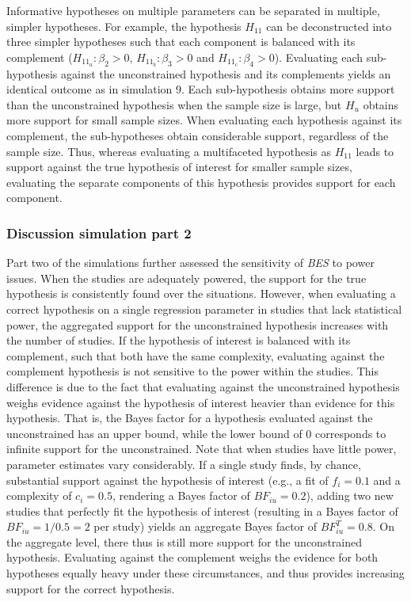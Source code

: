 \documentclass[
]{article}
\begin{document}
Informative hypotheses on multiple parameters can be separated in
multiple, simpler hypotheses. For example, the hypothesis \(H_{11}\) can
be deconstructed into three simpler hypotheses such that each component
is balanced with its complement (\(H_{11_a}: \beta_2 > 0\),
\(H_{11_b}: \beta_3 > 0\) and \(H_{11_c}: \beta_4 > 0\)). Evaluating
each sub-hypothesis against the unconstrained hypothesis and its
complements yields an identical outcome as in simulation 9. Each
sub-hypothesis obtains more support than the unconstrained hypothesis
when the sample size is large, but \(H_u\) obtains more support for
small sample sizes. When evaluating each hypothesis against its
complement, the sub-hypotheses obtain considerable support, regardless
of the sample size. Thus, whereas evaluating a multifaceted hypothesis
as \(H_{11}\) leads to support against the true hypothesis of interest
for smaller sample sizes, evaluating the separate components of this
hypothesis provides support for each component.

\hypertarget{discussion-simulation-part-2}{%
\subsubsection{Discussion simulation part
2}\label{discussion-simulation-part-2}}

Part two of the simulations further assessed the sensitivity of
\emph{BES} to power issues. When the studies are adequately powered, the
support for the true hypothesis is consistently found over the
situations. However, when evaluating a correct hypothesis on a single
regression parameter in studies that lack statistical power, the
aggregated support for the unconstrained hypothesis increases with the
number of studies. If the hypothesis of interest is balanced with its
complement, such that both have the same complexity, evaluating against
the complement hypothesis is not sensitive to the power within the
studies. This difference is due to the fact that evaluating against the
unconstrained hypothesis weighs evidence against the hypothesis of
interest heavier than evidence for this hypothesis. That is, the Bayes
factor for a hypothesis evaluated against the unconstrained has an upper
bound, while the lower bound of \(0\) corresponds to infinite support
for the unconstrained. Note that when studies have little power,
parameter estimates vary considerably. If a single study finds, by
chance, substantial support against the hypothesis of interest (e.g., a
fit of \(f_i=0.1\) and a complexity of \(c_i=0.5\), rendering a Bayes
factor of \(BF_{iu}=0.2\)), adding two new studies that perfectly fit
the hypothesis of interest (resulting in a Bayes factor of
\(BF_{iu}=1/0.5=2\) per study) yields an aggregate Bayes factor of
\(BF^T_{iu}=0.8\). On the aggregate level, there thus is still more
support for the unconstrained hypothesis. Evaluating against the
complement weighs the evidence for both hypotheses equally heavy under
these circumstances, and thus provides increasing support for the
correct hypothesis.
\end{document}
